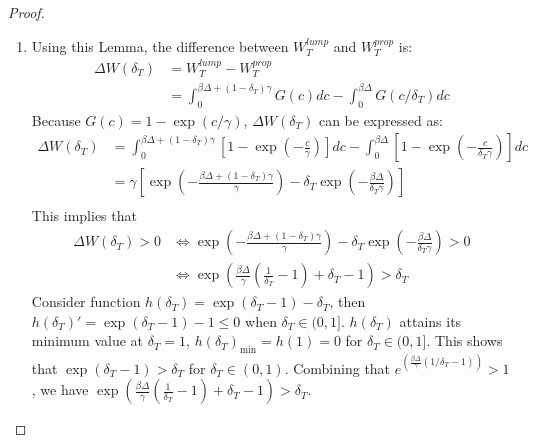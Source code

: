 \documentclass[11pt]{article}
\begin{document}
\begin{proof}
    \begin{enumerate}
        \item  Using this Lemma, the difference between $W_T^{lump}$ and $W_T^{prop}$ is:
        \begin{align*}
           \Delta W(\delta_T) &= W_{T}^{lump} - W_{T}^{prop}   \\
                & = \int_0^{\beta \Delta +(1-\delta_T)\gamma }G(c)dc - \int_0^{\beta \Delta }G(c/\delta_T)dc 
        \end{align*}
        Because $G(c)=1-\exp(c/\gamma)$, $\Delta W(\delta_T)$ can be expressed as:
        \begin{align*}
            \Delta W(\delta_T) & = \int_0^{\beta \Delta +(1-\delta_T)\gamma }\left[1-\exp \left(-\frac{c}{\gamma}\right)\right]dc-\int_0^{\beta \Delta }\left[1-\exp \left(-\frac{c}{\delta_T\gamma}\right)\right]dc \\
                & = \gamma \left[\exp\left(-\frac{\beta \Delta +(1-\delta_T)\gamma}{\gamma}\right)-\delta_T\exp\left(-\frac{\beta\Delta}{\delta_T\gamma}\right)\right] \\
        \end{align*}
        This implies that 
        \begin{align*}
            \Delta W(\delta_T) >0  &\Leftrightarrow \exp\left(-\frac{\beta \Delta +(1-\delta_T)\gamma}{\gamma}\right)-\delta_T\exp\left(-\frac{\beta\Delta}{\delta_T\gamma}\right)>0 \\
            &\Leftrightarrow \exp\left(\frac{\beta \Delta}{\gamma}\left(\frac{1}{\delta_T}-1\right)+\delta_T-1\right)>\delta_T
        \end{align*}
        Consider function $h(\delta_T)=\exp(\delta_T-1)-\delta_T$, then $h(\delta_T)'= \exp(\delta_T-1)-1\leq0$ when $\delta_T\in (0,1]$. $h(\delta_T)$ attains its minimum value at $\delta_T=1$, $h(\delta_T)_{\min}=h(1)=0$ for $\delta_T\in(0, 1]$. This shows that $\exp(\delta_T-1)>\delta_T$ for $\delta_T\in(0, 1)$. Combining that $e^{(\frac{\beta \Delta}{\gamma}(1/\delta_T-1))}>1$, we have $\exp\left(\frac{\beta \Delta}{\gamma}\left(\frac{1}{\delta_T}-1\right)+\delta_T-1\right)>\delta_T$. 


\end{enumerate}
\end{proof}
\end{document}
